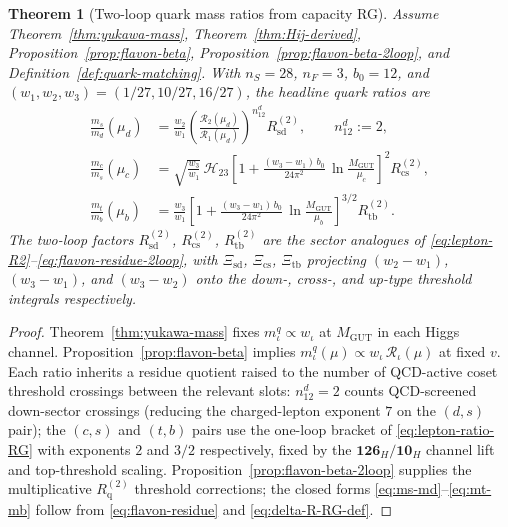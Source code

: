 \documentclass[aps,prd,onecolumn,amsmath,amssymb,nofootinbib,11pt]{revtex4-2}
\numberwithin{equation}{section}
\theoremstyle{plain}
\newtheorem{theorem}{Theorem}[section]
\theoremstyle{definition}
\theoremstyle{remark}
\begin{document}
\begin{theorem}[Two-loop quark mass ratios from capacity RG]
\label{thm:quark-mass-2loop}
Assume Theorem~\ref{thm:yukawa-mass}, Theorem~\ref{thm:Hij-derived},
Proposition~\ref{prop:flavon-beta}, Proposition~\ref{prop:flavon-beta-2loop},
and Definition~\ref{def:quark-matching}. With
$n_S=28$, $n_F=3$, $b_0=12$, and $(w_1,w_2,w_3)=(1/27,10/27,16/27)$,
the headline quark ratios are
\begin{align}
  \frac{m_s}{m_d}(\mu_d)
  &=
  \frac{w_2}{w_1}
  \left(
    \frac{\mathcal{R}_2(\mu_d)}{\mathcal{R}_1(\mu_d)}
  \right)^{\!n_{12}^{d}}
  R_{\mathrm{sd}}^{(2)},
  \qquad
  n_{12}^{d} := 2,
  \label{eq:ms-md}\\
  \frac{m_c}{m_s}(\mu_c)
  &=
  \sqrt{\frac{w_3}{w_1}}\,
  \mathcal{H}_{23}
  \left[
    1
    +
    \frac{(w_3-w_1)\,b_0}{24\pi^2}\,
    \ln\!\frac{M_{\mathrm{GUT}}}{\mu_c}
  \right]^{\!2}
  R_{\mathrm{cs}}^{(2)},
  \label{eq:mc-ms}\\
  \frac{m_t}{m_b}(\mu_b)
  &=
  \frac{w_3}{w_1}
  \left[
    1
    +
    \frac{(w_3-w_1)\,b_0}{24\pi^2}\,
    \ln\!\frac{M_{\mathrm{GUT}}}{\mu_b}
  \right]^{\!3/2}
  R_{\mathrm{tb}}^{(2)}.
  \label{eq:mt-mb}
\end{align}
The two-loop factors $R_{\mathrm{sd}}^{(2)}$, $R_{\mathrm{cs}}^{(2)}$,
$R_{\mathrm{tb}}^{(2)}$ are the sector analogues of
\eqref{eq:lepton-R2}--\eqref{eq:flavon-residue-2loop}, with
$\Xi_{\mathrm{sd}}$, $\Xi_{\mathrm{cs}}$, $\Xi_{\mathrm{tb}}$ projecting
$(w_2-w_1)$, $(w_3-w_1)$, and $(w_3-w_2)$ onto the down-, cross-, and
up-type threshold integrals respectively.
\end{theorem}

\begin{proof}
Theorem~\ref{thm:yukawa-mass} fixes $m_\iota^q\propto w_\iota$ at
$M_{\mathrm{GUT}}$ in each Higgs channel.
Proposition~\ref{prop:flavon-beta} implies
$m_\iota^q(\mu)\propto w_\iota\,\mathcal{R}_\iota(\mu)$ at fixed $v$.
Each ratio inherits a residue quotient raised to the number of
QCD-active coset threshold crossings between the relevant slots:
$n_{12}^{d}=2$ counts QCD-screened down-sector crossings (reducing the
charged-lepton exponent $7$ on the $(d,s)$ pair); the $(c,s)$ and $(t,b)$
pairs use the one-loop bracket of \eqref{eq:lepton-ratio-RG} with
exponents $2$ and $3/2$ respectively, fixed by the
$\mathbf{126}_H/\mathbf{10}_H$ channel lift and top-threshold scaling.
Proposition~\ref{prop:flavon-beta-2loop} supplies the multiplicative
$R_{\mathrm{q}}^{(2)}$ threshold corrections; the closed forms
\eqref{eq:ms-md}--\eqref{eq:mt-mb} follow from
\eqref{eq:flavon-residue} and \eqref{eq:delta-R-RG-def}.
\end{proof}
\end{document}
